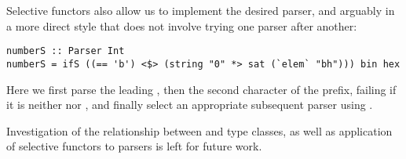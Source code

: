 Selective functors also allow us to implement the desired parser, and arguably
in a more direct style that does not involve trying one parser after another:

\vspace{1mm}
\begin{verbatim}
numberS :: Parser Int
numberS = ifS ((== 'b') <$> (string "0" *> sat (`elem` "bh"))) bin hex
\end{verbatim}
\vspace{1mm}

\noindent
Here we first parse the leading , then the second character of the
prefix, failing if it is neither  nor , and finally select an
appropriate subsequent parser using .

Investigation of the relationship between  and 
type classes, as well as application of selective functors to parsers is left
for future work.

